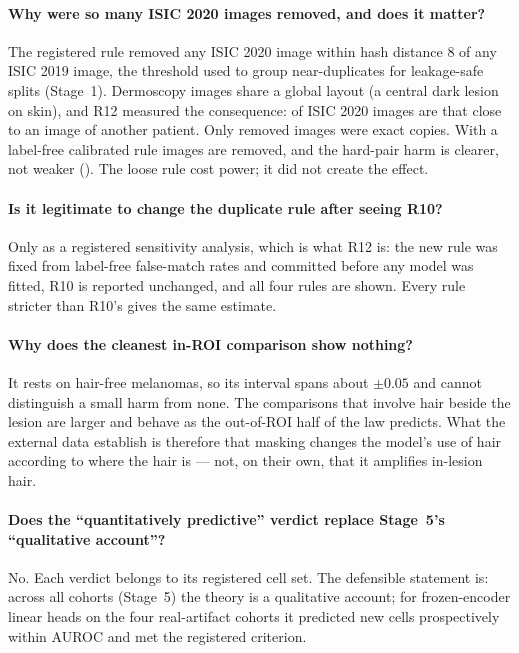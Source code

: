 \paragraph{Why were so many ISIC 2020 images removed, and does it matter?} The registered rule removed any ISIC 2020 image
within hash distance 8 of any ISIC 2019 image, the threshold used to group near-duplicates for leakage-safe splits
(Stage~1). Dermoscopy images share a global layout (a central dark lesion on skin), and R12 measured the consequence:
\sSevenFEight{} of ISIC 2020 images are that close to an image of another patient. Only \sSevenDupZerotoZero{} removed images
were exact copies. With a label-free calibrated rule \sSevenDropcalibrated{} images are removed, and the hard-pair harm is
clearer, not weaker (\sSevenTcalibratedhard). The loose rule cost power; it did not create the effect.
\paragraph{Is it legitimate to change the duplicate rule after seeing R10?} Only as a registered sensitivity analysis, which
is what R12 is: the new rule was fixed from label-free false-match rates and committed before any model was fitted, R10 is
reported unchanged, and all four rules are shown. Every rule stricter than R10's gives the same estimate.
\paragraph{Why does the cleanest in-ROI comparison show nothing?} It rests on \sSevenHZeroMel{} hair-free melanomas, so
its interval spans about $\pm0.05$ and cannot distinguish a small harm from none. The comparisons that involve hair beside
the lesion are larger and behave as the out-of-ROI half of the law predicts. What the external data establish is therefore
that masking changes the model's use of hair according to where the hair is --- not, on their own, that it amplifies
in-lesion hair.
\paragraph{Does the ``quantitatively predictive'' verdict replace Stage~5's ``qualitative account''?} No. Each verdict
belongs to its registered cell set. The defensible statement is: across all cohorts (Stage~5) the theory is a qualitative
account; for frozen-encoder linear heads on the four real-artifact cohorts it predicted \sSevenTN{} new cells
prospectively within \sSevenTMae{} AUROC and met the registered criterion.

